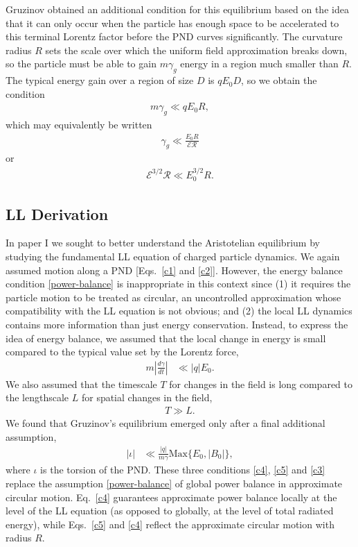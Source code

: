 \documentclass[amsmath,amssymb,nofootinbib,notitlepage,superscriptaddress,twocolumn]{revtex4-2}
\begin{document}
Gruzinov obtained an additional condition for this equilibrium based on the idea that it can only occur when the particle has enough space to be accelerated to this terminal Lorentz factor before the PND curves significantly.  The curvature radius $R$ sets the scale over which the uniform field approximation breaks down, so the particle must be able to gain $m \gamma_g$ energy in a region much smaller than $R$.  The typical energy gain over a region of size $D$ is $q E_0 D$, so we obtain the condition
\begin{align}
    m \gamma_g \ll q E_0 R,
\end{align}
which may equivalently be written
\begin{align}
\gamma_g \ll \frac{E_0 R}{\mathcal{E} \mathcal{R}}
\end{align}
or
\begin{align}\label{gruzicond}
\mathcal{E}^{3/2} \mathcal{R} \ll E_0^{3/2} R.
\end{align}

\subsection{LL Derivation}

In paper I \cite{Cai:2022mkw} we sought to better understand the Aristotelian equilibrium by studying the fundamental LL equation of charged particle dynamics.  We again assumed motion along a PND [Eqs.~\eqref{c1} and \eqref{c2}].  However, the energy balance condition \eqref{power-balance} is inappropriate in this context since (1) it requires the particle motion to be treated as circular, an uncontrolled approximation whose compatibility with the LL equation is not obvious; and (2) the local LL dynamics contains more information than just energy conservation.  Instead, to express the idea of energy balance, we assumed that the local change in energy is small compared to the typical value set by the Lorentz force,
\begin{align}
    m \left|\frac{d\gamma}{dt}\right| & \ll |q| E_0. \label{c4} 
\end{align}
We also assumed that the timescale $T$ for changes in the field is long compared to the lengthscale $L$ for spatial changes in the field,
\begin{align}\label{c5}
    T \gg L.
\end{align}
We found that Gruzinov's equilibrium emerged only after a final additional assumption,
\begin{align}
    |\iota| & \ll \frac{|q|}{m\gamma}\textrm{Max}\{E_0,|B_0|\} ,\label{c3}
\end{align}
where $\iota$ is the torsion of the PND.  These three conditions \eqref{c4}, \eqref{c5} and \eqref{c3} replace the assumption \eqref{power-balance} of global power balance in approximate circular motion.  Eq.~\eqref{c4} guarantees approximate power balance locally at the level of the LL equation (as opposed to globally, at the level of total radiated energy), while Eqs.~\eqref{c5} and \eqref{c4} reflect the approximate circular motion with radius $R$.
\end{document}
